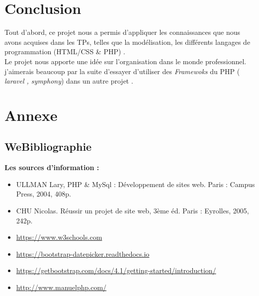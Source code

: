 \documentclass[a4paper,12pt]{report}
\begin{document}
\chapter{Conclusion}
Tout d'abord, ce projet nous a permis d'appliquer les connaissances que nous avons acquises dans les TPs, telles que la modélisation, les différents langages de programmation (HTML/CSS \& PHP) .\\
Le projet nous apporte une idée sur l'organisation dans le monde professionnel.
j'aimerais beaucoup par la suite d'essayer d'utiliser des \textit{Framewoks} du PHP ( \textit{laravel , symphony}) dans un autre projet .
\chapter{Annexe}
\section{WeBibliographie}
\textbf{Les sources d’information :} \\
\begin{itemize}
\item ULLMAN Lary, PHP \& MySql : Développement de sites web. Paris : Campus Press, 2004, 408p.
\item CHU Nicolas. Réussir un projet de site web, 3ème éd. Paris : Eyrolles, 2005, 242p.
\item \url{https://www.w3schools.com} 
\item \url{https://bootstrap-datepicker.readthedocs.io}
\item \url{https://getbootstrap.com/docs/4.1/getting-started/introduction/}
\item \url{http://www.manuelphp.com/}
\end{itemize}
\end{document}
